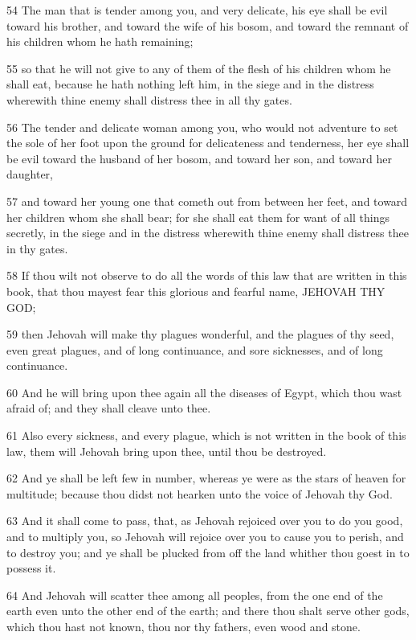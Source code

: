 \par 54 The man that is tender among you, and very delicate, his eye shall be evil toward his brother, and toward the wife of his bosom, and toward the remnant of his children whom he hath remaining;
\par 55 so that he will not give to any of them of the flesh of his children whom he shall eat, because he hath nothing left him, in the siege and in the distress wherewith thine enemy shall distress thee in all thy gates.
\par 56 The tender and delicate woman among you, who would not adventure to set the sole of her foot upon the ground for delicateness and tenderness, her eye shall be evil toward the husband of her bosom, and toward her son, and toward her daughter,
\par 57 and toward her young one that cometh out from between her feet, and toward her children whom she shall bear; for she shall eat them for want of all things secretly, in the siege and in the distress wherewith thine enemy shall distress thee in thy gates.
\par 58 If thou wilt not observe to do all the words of this law that are written in this book, that thou mayest fear this glorious and fearful name, JEHOVAH THY GOD;
\par 59 then Jehovah will make thy plagues wonderful, and the plagues of thy seed, even great plagues, and of long continuance, and sore sicknesses, and of long continuance.
\par 60 And he will bring upon thee again all the diseases of Egypt, which thou wast afraid of; and they shall cleave unto thee.
\par 61 Also every sickness, and every plague, which is not written in the book of this law, them will Jehovah bring upon thee, until thou be destroyed.
\par 62 And ye shall be left few in number, whereas ye were as the stars of heaven for multitude; because thou didst not hearken unto the voice of Jehovah thy God.
\par 63 And it shall come to pass, that, as Jehovah rejoiced over you to do you good, and to multiply you, so Jehovah will rejoice over you to cause you to perish, and to destroy you; and ye shall be plucked from off the land whither thou goest in to possess it.
\par 64 And Jehovah will scatter thee among all peoples, from the one end of the earth even unto the other end of the earth; and there thou shalt serve other gods, which thou hast not known, thou nor thy fathers, even wood and stone.
